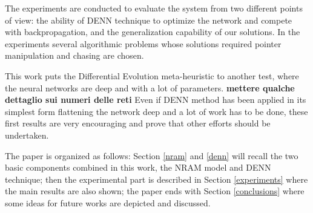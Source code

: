 The experiments are conducted to evaluate the system from two different points of view: the ability of DENN technique to optimize the network and compete with backpropagation, and the generalization capability of our solutions. In the experiments several algorithmic problems whose solutions required
pointer manipulation and chasing are chosen.
 
This work puts the Differential Evolution meta-heuristic to another test, where the neural networks are deep and with a lot of parameters. {\bf mettere qualche dettaglio sui numeri delle reti}
Even if DENN method has been applied in its simplest form flattening the network deep and a lot of work has to be done, these first results are very encouraging and prove that other efforts should be undertaken. 

The paper is organized as follows: Section \ref{nram} and \ref{denn} will recall the two basic components combined in this work, the NRAM model and DENN technique; then the experimental part is described in Section \ref{experiments} where the main results are also shown; the paper ends with Section \ref{conclusions} where some ideas for future works are depicted and discussed.